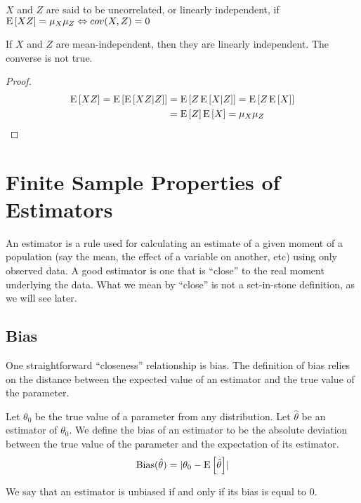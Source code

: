 \begin{definition}
$X$ and $Z$ are said to be uncorrelated, or linearly independent, if $\operatorname{E}\left[XZ\right] = \mu_X\mu_Z \Leftrightarrow cov(X,Z) = 0$
\end{definition}

\begin{proposition}
If $X$ and $Z$ are mean-independent, then they are linearly independent. The converse is not true.
\end{proposition}
\begin{proof}
\begin{align*}
\operatorname{E}\left[XZ\right] = \operatorname{E}\left[\operatorname{E}\left[XZ|Z\right]\right] & = \operatorname{E}\left[Z\operatorname{E}\left[X|Z\right]\right] = \operatorname{E}\left[Z\operatorname{E}\left[X\right]\right] \\
& = \operatorname{E}\left[Z\right]\operatorname{E}\left[X\right] = \mu_X\mu_Z
\end{align*}
\end{proof}

\section{Finite Sample Properties of Estimators}

An estimator is a rule used for calculating an estimate of a given moment of a population (say the mean, the effect of a variable on another, etc) using only observed data. A good estimator is one that is ``close'' to the real moment underlying the data. What we mean by ``close'' is not a set-in-stone definition, as we will see later. 

\subsection{Bias}

One straightforward ``closeness'' relationship is bias. The definition of bias relies on the distance between the expected value of an estimator and the true value of the parameter.

\begin{definition} 
Let $\theta_0$ be the true value of a parameter from any distribution. Let $\hat{\theta}$ be an estimator of $\theta_0$. We define the bias of an estimator to be the absolute deviation between the true value of the parameter and the expectation of its estimator. $$\operatorname{Bias}(\hat{\theta}) = \lvert \theta_0 - \operatorname{E}\left[\hat{\theta}\right] \rvert $$

We say that an estimator is unbiased if and only if its bias is equal to 0.
\end{definition}

